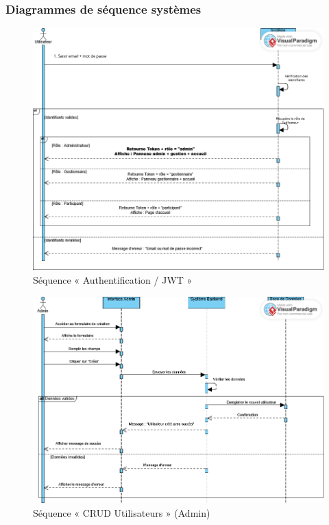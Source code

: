 \subsubsection{Diagrammes de séquence systèmes}
\vspace{-1em}
\begin{figure}[H]
  \centering
  \includegraphics[width=\linewidth]{projet/images/diagramme de sequance/diagrame de sequance s'athentifier.png}
  \caption{Séquence « Authentification / JWT »}
  \label{fig:seq-auth}
\end{figure}

\begin{figure}[H]
  \centering
  \includegraphics[width=\linewidth]{projet/images/diagramme de sequance/cree utilisateur admin sequance diagram.png}
  \caption{Séquence « CRUD Utilisateurs » (Admin) }
  \label{fig:seq-crud}
\end{figure}

